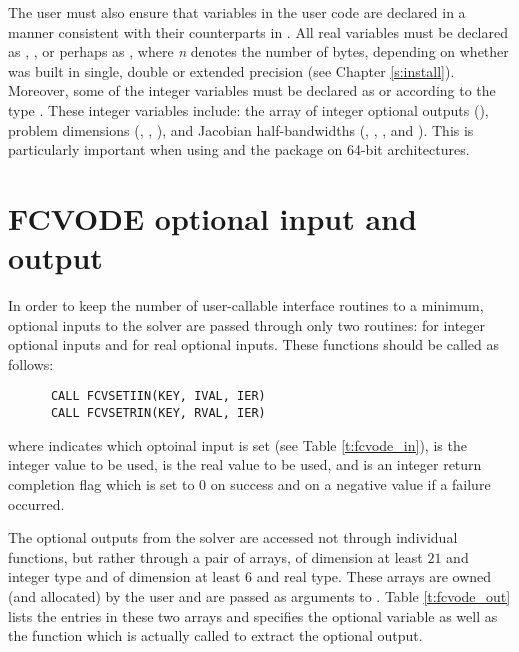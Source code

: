 The user must also ensure that variables in the user {\F} code are
declared in a manner consistent with their counterparts in {\cvode}.
All real variables must be declared as , ,
or perhaps as , where {\em n} denotes the number of bytes,
depending on whether {\cvode} was built in single, double or extended precision 
(see Chapter \ref{s:install}). Moreover, some of the {\F} integer variables
must be declared as  or  according to the 
{\C} type . These integer variables include: the array
of integer optional outputs (), problem dimensions (,
, ), and Jacobian half-bandwidths (, ,
, and ). This is particularly important when using
{\cvode} and the {\fcvode} package on 64-bit architectures.

\section{FCVODE optional input and output}

In order to keep the number of user-callable {\fcvode} interface routines to
a minimum, optional inputs to the {\cvode} solver are passed through only
two routines:  for integer optional inputs and 
for real optional inputs. These functions should be called as follows:
\begin{verbatim}
      CALL FCVSETIIN(KEY, IVAL, IER)
      CALL FCVSETRIN(KEY, RVAL, IER)
\end{verbatim}
where 
 indicates which optoinal input is set (see Table \ref{t:fcvode_in}),
 is the integer value to be used,
 is the real value to be used, and
 is an integer return completion flag which is set to $0$ on success and on 
a negative value if a failure occurred.


The optional outputs from the {\cvode} solver are accessed not through individual
functions, but rather through a pair of arrays,  of dimension at least $21$ 
and  integer type and  of dimension at least $6$ and real type. 
These arrays are owned (and allocated) by the user and are passed as arguments to 
.
Table \ref{t:fcvode_out} lists the entries in these two arrays and specifies the
optional variable as well as the {\cvode} function which is actually called to
extract the optional output.

